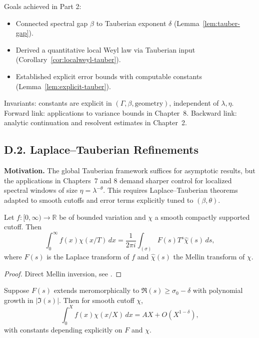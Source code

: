 \begin{auditblock}[D2]
Goals achieved in Part 2:
\begin{itemize}
  \item Connected spectral gap $\beta$ to Tauberian exponent $\delta$ (Lemma~\ref{lem:tauber-gap}).  
  \item Derived a quantitative local Weyl law via Tauberian input (Corollary~\ref{cor:localweyl-tauber}).  
  \item Established explicit error bounds with computable constants (Lemma~\ref{lem:explicit-tauber}).  
\end{itemize}
Invariants: constants are explicit in $(\Gamma,\beta, \text{geometry})$, independent of $\lambda,\eta$.  
Forward link: applications to variance bounds in Chapter~8.  
Backward link: analytic continuation and resolvent estimates in Chapter~2.  
\end{auditblock}

\subsection*{D.2. Laplace--Tauberian Refinements}

\noindent \textbf{Motivation.}  
The global Tauberian framework suffices for asymptotic results, but the applications in Chapters~7 and 8 demand sharper control for localized spectral windows of size $\eta = \lambda^{-\theta}$.  
This requires Laplace–Tauberian theorems adapted to smooth cutoffs and error terms explicitly tuned to $(\beta,\theta)$.

\medskip

\begin{lemma}\label{lem:laplace-cutoff}
Let $f:[0,\infty)\to \mathbb R$ be of bounded variation and $\chi$ a smooth compactly supported cutoff. Then
\[
\int_0^\infty f(x)\chi(x/T)\,dx
= \frac{1}{2\pi i} \int_{(\sigma)} F(s) T^s \widehat{\chi}(s)\,ds,
\]
where $F(s)$ is the Laplace transform of $f$ and $\widehat{\chi}(s)$ the Mellin transform of $\chi$.  
\end{lemma}

\begin{proof}
Direct Mellin inversion, see \cite[Chap.~II]{Korevaar2004}.  
\end{proof}

\medskip

\begin{lemma}\label{lem:laplace-quant}
Suppose $F(s)$ extends meromorphically to $\Re(s)\ge \sigma_0-\delta$ with polynomial growth in $|\Im(s)|$.  
Then for smooth cutoff $\chi$,
\[
\int_0^X f(x)\chi(x/X)\,dx = A X + O(X^{1-\delta}),
\]
with constants depending explicitly on $F$ and $\chi$.  
\end{lemma}


